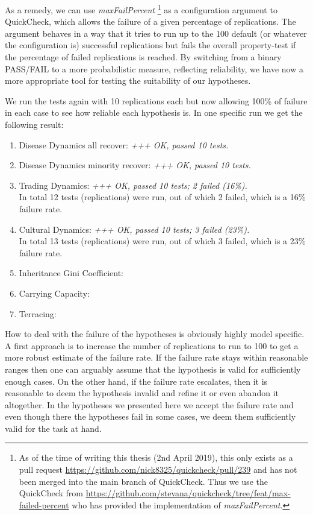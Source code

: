 As a remedy, we can use \textit{maxFailPercent} \footnote{As of the time of writing this thesis (2nd April 2019), this only exists as a pull request \url{https://github.com/nick8325/quickcheck/pull/239} and has not been merged into the main branch of QuickCheck. Thus we use the QuickCheck from \url{https://github.com/stevana/quickcheck/tree/feat/max-failed-percent} who has provided the implementation of \textit{maxFailPercent}.} as a configuration argument to QuickCheck, which allows the failure of a given percentage of replications. The argument behaves in a way that it tries to run up to the 100 default (or whatever the configuration is) successful replications but fails the overall property-test if the percentage of failed replications is reached. By switching from a binary PASS/FAIL to a more probabilistic measure, reflecting reliability, we have now a more appropriate tool for testing the suitability of our hypotheses. 

We run the tests again with 10 replications each but now allowing 100\% of failure in each case to see how reliable each hypothesis is. In one specific run we get the following result:

\begin{enumerate}
	\item Disease Dynamics all recover: \textit{+++ OK, passed 10 tests.}

	\item Disease Dynamics minority recover: \textit{+++ OK, passed 10 tests.}
		
	\item Trading Dynamics: \textit{+++ OK, passed 10 tests; 2 failed (16\%).} \\ In total 12 tests (replications) were run, out of which 2 failed, which is a 16\% failure rate.
	
	\item Cultural Dynamics: \textit{+++ OK, passed 10 tests; 3 failed (23\%).} \\ In total 13 tests (replications) were run, out of which 3 failed, which is a 23\% failure rate.

	\item Inheritance Gini Coefficient: 
	
	\item Carrying Capacity:
		
	\item Terracing:
\end{enumerate}

How to deal with the failure of the hypotheses is obviously highly model specific. A first approach is to increase the number of replications to run to 100 to get a more robust estimate of the failure rate. If the failure rate stays within reasonable ranges then one can arguably assume that the hypothesis is valid for sufficiently enough cases. On the other hand, if the failure rate escalates, then it is reasonable to deem the hypothesis invalid and refine it or even abandon it altogether. In the hypotheses we presented here we accept the failure rate and even though there the hypotheses fail in some cases, we deem them sufficiently valid for the task at hand.


